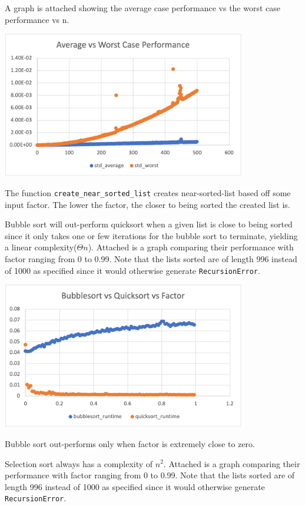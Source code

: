 \documentclass{article}
\begin{document}
A graph is attached showing the average case performance vs the worst case performance vs n.

\includegraphics[width=0.8\textwidth]{average_vs_worst_case_performance}

\medskip
The function \verb|create_near_sorted_list| creates near-sorted-list based off 
some input factor. The lower the factor, the closer to being sorted the created list is.

Bubble sort will out-perform quicksort when a given list is close to being sorted 
since it only takes one or few iterations for the bubble sort to terminate, yielding 
a linear complexity($\Theta{n}$). Attached is a graph comparing their performance 
with factor ranging from 0 to 0.99. Note that the lists sorted are of length 996 
instead of 1000 as specified since it would otherwise generate \verb|RecursionError|.

\includegraphics[width=0.8\textwidth]{bubblesort_vs_quicksort_vs_factor}

Bubble sort out-performs only when factor is extremely close to zero.

\medskip
Selection sort always has a complexity of $n^2$. Attached is a graph comparing their 
performance with factor ranging from 0 to 0.99. Note that the lists sorted are of 
length 996 instead of 1000 as specified since it would otherwise generate \verb|RecursionError|.
\end{document}

